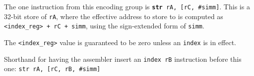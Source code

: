 \documentclass{article}
\begin{document}
	The one instruction from this encoding group is
	\texttt{\textbf{str} rA, [rC, \#simm]}.
	This is a 32-bit store of \texttt{rA}, where the effective address to
	store to is computed as \texttt{<index\_reg> + rC + simm}, using the
	sign-extended form of \texttt{simm}.

	The \texttt{<index\_reg>} value is guaranteed to be zero unless an
	\texttt{index} is in effect.

	Shorthand for having the assembler insert an \texttt{index rB}
	instruction before this one: \texttt{str rA, [rC, rB, \#simm]}



\end{document}
